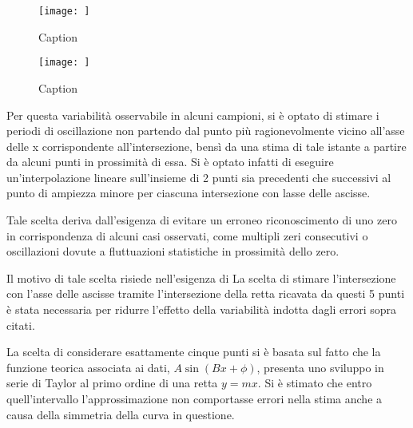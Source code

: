 \documentclass[a4paper,11pt,oneside]{article}
\begin{document}
\begin{figure}
    \centering
    \texttt{[image: ]}
    \caption{Caption}
    \label{fig:esempio_buono}
\end{figure}

\begin{figure}
    \centering
    \texttt{[image: ]}
    \caption{Caption}
    \label{fig:esempio_brutto}
\end{figure}


Per questa variabilità osservabile in alcuni campioni, si è optato di stimare i periodi di oscillazione non partendo dal punto più ragionevolmente vicino all'asse delle x corrispondente all'intersezione, bensì da una stima di tale istante a partire da alcuni punti in prossimità di essa. Si è optato infatti di eseguire un'interpolazione lineare sull'insieme di 2 punti sia precedenti che successivi al punto di ampiezza minore per ciascuna intersezione con lasse delle ascisse.

Tale scelta deriva dall'esigenza di evitare un erroneo riconoscimento di uno zero in corrispondenza di alcuni casi osservati, come multipli zeri consecutivi o oscillazioni dovute a fluttuazioni statistiche in prossimità dello zero.

Il motivo di tale scelta risiede nell'esigenza di 
La scelta di stimare l'intersezione con l'asse delle ascisse tramite l'intersezione della retta ricavata da questi 5 punti è stata necessaria per ridurre l'effetto della variabilità indotta dagli errori sopra citati. 

La scelta di considerare esattamente cinque punti si è basata sul fatto che la funzione teorica associata ai dati, $A \sin (Bx+\phi)$, presenta uno sviluppo in serie di Taylor al primo ordine di una retta $y=m x$. Si è stimato che entro quell'intervallo l'approssimazione non comportasse errori nella stima anche a causa della simmetria della curva in questione.
\end{document}
